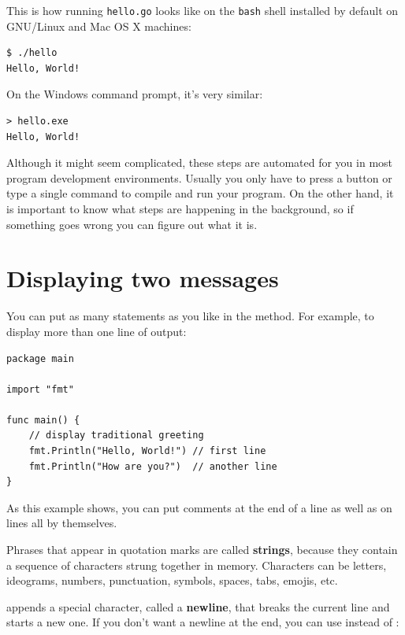 This is how running {\tt hello.go} looks like on the {\tt bash} shell installed by default on GNU/Linux and Mac OS X machines:

\begin{verbatim}
$ ./hello 
Hello, World!
\end{verbatim}

On the Windows command prompt, it's very similar:

\begin{verbatim}
> hello.exe 
Hello, World!
\end{verbatim}


Although it might seem complicated, these steps are automated for you in most program development environments.
Usually you only have to press a button or type a single command to compile and run your program.
On the other hand, it is important to know what steps are happening in the background,
so if something goes wrong you can figure out what it is.


\section{Displaying two messages}

You can put as many statements as you like in the  method.
For example, to display more than one line of output:

\begin{lstlisting}
package main

import "fmt"

func main() {
	// display traditional greeting
	fmt.Println("Hello, World!") // first line
	fmt.Println("How are you?")  // another line
}
\end{lstlisting}

As this example shows, you can put comments at the end of a line as well as on lines all by themselves.


Phrases that appear in quotation marks are called {\bf strings}, because they contain a sequence of characters strung together in memory.
Characters can be letters, ideograms, numbers, punctuation, symbols, spaces, tabs, emojis, etc.


 appends a special character, called a {\bf newline}, that breaks the current line and starts a new one.
If you don't want a newline at the end, you can use  instead of :

